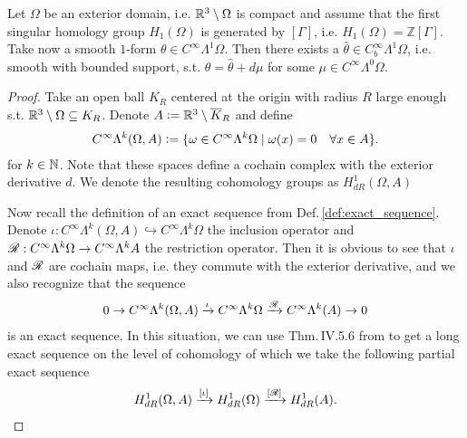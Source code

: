 \documentclass[../master_thesis.tex]{subfiles}
\begin{document}
\begin{lemma}\label{lem:1form_with_bounded_support_in_same_cohomology}
    Let $\Omega$ be an exterior domain, i.e. $\mathbb{R}^3 \setminus \Omega$ is compact 
    and assume that the first singular homology 
    group $H_1(\Omega)$ is generated by $[\Gamma]$, i.e. $H_1(\Omega) = \mathbb{Z} [\Gamma]$.
    Take now a smooth $1$-form $\theta \in C^\infty \Lambda^1 \Omega$.
    Then there exists a $\hat{\theta} \in C^\infty_b \Lambda^1 \Omega $, i.e. smooth with 
    bounded support,
    s.t. $\theta = \hat{\theta} + d\mu$ for some $\mu \in C^\infty \Lambda^0 \Omega $.
\end{lemma}
\begin{proof}
    Take an open ball $K_R$ centered at the origin with radius $R$ large enough s.t. 
    $\mathbb{R}^3 \setminus \Omega \subseteq K_R$. Denote 
    $A \vcentcolon= \mathbb{R}^3 \setminus \overline{K}_R$ and define 
    \begin{align*}
        C^\infty \Lambda^k(\Omega, A) 
        \vcentcolon= \{ \omega \in C^\infty \Lambda^k \Omega  \mid \omega(x) = 0 \quad\forall x \in A \}.
    \end{align*}
    for $k \in \mathbb{N}$. Note that these spaces define a cochain complex with the exterior derivative $d$.
    We denote the resulting cohomology groups as $H^1_{dR}(\Omega,A)$

    Now recall the definition of an exact sequence from Def.\,\ref{def:exact_sequence}. Denote 
    $\iota: C^\infty \Lambda^k(\Omega, A) \hookrightarrow  C^\infty \Lambda^k \Omega $ the 
    inclusion operator and $\mathscr{R}: C^\infty \Lambda^k \Omega  \rightarrow C^\infty \Lambda^k A$ 
    the restriction operator. Then it is obvious to see that 
    $\iota$ and $\mathscr{R}$ are cochain maps, i.e. they commute with the exterior derivative, and we also recognize that 
    the sequence 
    \begin{align*}
        0 \rightarrow C^\infty \Lambda^k(\Omega, A) \xrightarrow{\iota}
        C^\infty \Lambda^k \Omega  \xrightarrow{\mathscr{R}} C^\infty \Lambda^k(A) \rightarrow 0
    \end{align*}
    is an exact sequence. In this situation, we can use Thm.\,IV.5.6 from \cite{topology_and_geometry}
    to get a long exact sequence on the level of cohomology of which we take the following partial 
    exact sequence
    \begin{align*}
        H_{dR}^1(\Omega,A) \xrightarrow{[\iota]} H_{dR}^1(\Omega) \xrightarrow{[\mathscr{R}]} H_{dR}^1(A).
    \end{align*}


\end{proof}
\end{document}
